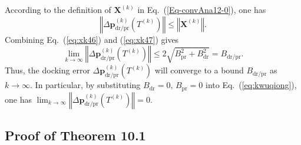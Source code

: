 According to the definition of $\mathbf{X}^{\left(k\right)}$ in Eq.\ (\ref{Eq-convAna12-0}),
one has
\begin{equation}
\left\Vert \Delta{\mathbf{p}}_{\text{dr/pr}}^{\left(k\right)}\left(T^{\left(k\right)}\right)\right\Vert \leq\left\Vert \mathbf{X}^{\left(k\right)}\right\Vert .\label{eq:xk47}
\end{equation}
Combining Eq.\ (\ref{eq:xk46}) and (\ref{eq:xk47}) gives
\begin{equation}
\lim_{k\rightarrow\infty}\left\Vert \Delta{\mathbf{p}}_{\text{dr/pr}}^{\left(k\right)}\left(T^{\left(k\right)}\right)\right\Vert \leq2\sqrt{B_{\text{pr}}^{2}+B_{\text{dr}}^{2}}=B_{\text{dr/pr}}.\label{eq:kwuqiong}
\end{equation}
Thus, the docking error $\Delta{\mathbf{p}}_{\text{dr/pr}}^{\left(k\right)}\left(T^{\left(k\right)}\right)$
will converge to a bound $B_{\text{dr/pr}}$ as $k\rightarrow\infty$.
In particular, by substituting $B_{\text{dr}}=0\text{, }B_{\text{pr}}=0$
into Eq.\ (\ref{eq:kwuqiong}), one has $\lim_{k\rightarrow\infty}\left\Vert \Delta{\mathbf{p}}_{\text{dr/pr}}^{\left(k\right)}\left(T^{\left(k\right)}\right)\right\Vert =0$. 

\subsection{Proof of Theorem 10.1}

\label{Proof1}

